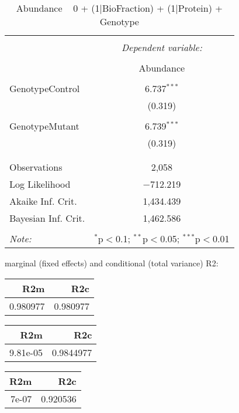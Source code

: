\documentclass[11pt]{report}
\begin{document}
\begin{table}[!htbp] \centering 
  \caption{Abundance ~ 0 + (1|BioFraction) + (1|Protein) + Genotype} 
  \label{} 
\begin{tabular}{@{\extracolsep{5pt}}lc} 
\\[-1.8ex]\hline 
\hline \\[-1.8ex] 
 & \multicolumn{1}{c}{\textit{Dependent variable:}} \\ 
\cline{2-2} 
\\[-1.8ex] & Abundance \\ 
\hline \\[-1.8ex] 
 GenotypeControl & 6.737$^{***}$ \\ 
  & (0.319) \\ 
  & \\ 
 GenotypeMutant & 6.739$^{***}$ \\ 
  & (0.319) \\ 
  & \\ 
\hline \\[-1.8ex] 
Observations & 2,058 \\ 
Log Likelihood & $-$712.219 \\ 
Akaike Inf. Crit. & 1,434.439 \\ 
Bayesian Inf. Crit. & 1,462.586 \\ 
\hline 
\hline \\[-1.8ex] 
\textit{Note:}  & \multicolumn{1}{r}{$^{*}$p$<$0.1; $^{**}$p$<$0.05; $^{***}$p$<$0.01} \\ 
\end{tabular} 
\end{table} 
marginal (fixed effects) and conditional (total variance) R2:

\begin{tabular}{r|r}
\hline
R2m & R2c\\
\hline
0.980977 & 0.980977\\
\hline
\end{tabular}

\begin{tabular}{r|r}
\hline
R2m & R2c\\
\hline
9.81e-05 & 0.9844977\\
\hline
\end{tabular}

\begin{tabular}{r|r}
\hline
R2m & R2c\\
\hline
7e-07 & 0.920536\\
\hline
\end{tabular}
\end{document}
